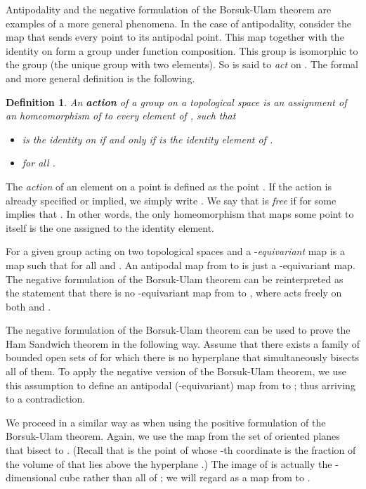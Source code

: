 \documentclass{article}
\newtheorem{defini}{Definition}
\begin{document}
Antipodality and the negative formulation of the Borsuk-Ulam theorem
are examples of a more general phenomena. In the case of antipodality,
 consider the map that sends every point 
to its antipodal point. This map together with the identity on 
form a group under function composition. This group is isomorphic to the group  
(the unique group with two elements).
So  is said to \emph{act} on . The formal and more
general definition is the following.

\begin{defini}
An \textbf{action} of a group  on a topological space  is 
an assignment of an homeomorphism  of  to every
element  of , such that

\begin{itemize}

\item  is the identity on  if and only if  is the identity element of .

\item  for all .

\end{itemize} 

\end{defini}

The \emph{action} of an element  on a point  is defined as the point
. If the action is already specified or implied,
we simply write . We say that   is \emph{free}
if  for some  implies that .
In other words, the only homeomorphism that
maps some point to itself is the one assigned
to the identity element. 

For a given group  acting on two topological
spaces  and  a -\emph{equivariant} map
is a map 
such that  for all  and .
An antipodal map from  to  is just a 
-equivariant map. The negative formulation of the
Borsuk-Ulam theorem can be reinterpreted as the statement that 
there is no -equivariant map
from  to , where  acts
freely on both  and .

The negative formulation of the Borsuk-Ulam theorem can
be used to prove the Ham Sandwich theorem in the following way.
Assume that there exists a family of bounded open sets 
of  for which there is no hyperplane that simultaneously
bisects all of them. To apply the negative version
of the Borsuk-Ulam theorem, we use this assumption to define
an antipodal (-equivariant) map 
from  to ; thus arriving to a contradiction.

We proceed in a similar way as when using the positive
formulation of the Borsuk-Ulam theorem. Again, we use the map 
 from the set of oriented planes that bisect  to .
(Recall that  is the point of  whose 
-th coordinate is the fraction of the volume of  that lies above
the hyperplane .)
The image of  is actually the -dimensional cube  rather
than all of ; we will regard
 as a map from  to . 
\end{document}
